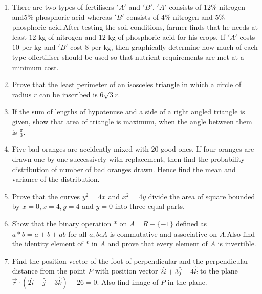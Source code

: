 \documentclass[12pt,-letter paper]{article}
\providecommand{\brak}[1]{\ensuremath{\left(#1\right)}}
\begin{document}
\begin{enumerate}
\item There are two types of fertilisers $'A'$ and $'B'$, $'A'$ consists of $12\%$ nitrogen and$5\%$ phosphoric acid whereas $'B'$ consists of $4\%$ nitrogen and $5\%$ phosphoric acid.After testing the soil conditions, farmer finds that he needs at least $12$ kg of nitrogen and $12$ kg of phosphoric acid for his crops. If $'A'$ costs \rupee$10$ per kg and $'B'$ cost \rupee$8$ per kg, then graphically determine how much of each type offertiliser should be used so that nutrient requirements are met at a minimum cost.
\item Prove that the least perimeter of an isosceles triangle in which a circle of radius $r$ can be inscribed is $6\sqrt{3}r$.
\item If the sum of lengths of hypotenuse and a side of a right angled triangle is given, show that area of triangle is maximum, when the angle between them is $\frac{\pi}{3}$.
\item Five bad oranges are accidently mixed with $20$ good ones. If four oranges are drawn one by one successively with replacement, then find the probability distribution of number of bad oranges drawn. Hence find the mean and variance of the distribution.
\item Prove that the curves $y^2=4x$ and $x^2=4y$ divide the area of square bounded by $x=0 ,x=4,y=4$ and $y=0$ into three equal parts.
\item Show that the binary operation * on $A$ =$ R -\{-1\}$ defined as $a*b=a+b+ab$ for all  $a,b \epsilon A$ is commutative and associative on $A$.Also find the identity element of * in $A$ and prove that every element of $A$ is invertible.
\item Find the position vector of the foot of perpendicular and the perpendicular distance from the point $P$ with position vector $2\hat{i}+3\hat{j}+4\hat{k}$ to the plane $\overset{\rightarrow}{r} \cdot\brak{2\hat{i}+\hat{j}+3\hat{k}}-26 = 0$. Also find image of $P$ in the plane.





\end{enumerate} 
\end{document}
